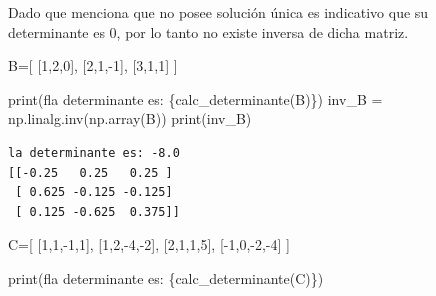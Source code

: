 \documentclass[
  letterpaper,
  DIV=11,
  numbers=noendperiod]{scrartcl}
\newenvironment{Shaded}{\begin{snugshade}}{\end{snugshade}}
\newcommand{\BuiltInTok}[1]{\textcolor[rgb]{0.00,0.23,0.31}{#1}}
\newcommand{\DecValTok}[1]{\textcolor[rgb]{0.68,0.00,0.00}{#1}}
\newcommand{\NormalTok}[1]{\textcolor[rgb]{0.00,0.23,0.31}{#1}}
\newcommand{\OperatorTok}[1]{\textcolor[rgb]{0.37,0.37,0.37}{#1}}
\newcommand{\SpecialCharTok}[1]{\textcolor[rgb]{0.37,0.37,0.37}{#1}}
\newcommand{\SpecialStringTok}[1]{\textcolor[rgb]{0.13,0.47,0.30}{#1}}
\begin{document}
Dado que menciona que no posee solución única es indicativo que su
determinante es 0, por lo tanto no existe inversa de dicha matriz.

\begin{Shaded}
\begin{Highlighting}[]
\NormalTok{B}\OperatorTok{=}\NormalTok{[}
\NormalTok{    [}\DecValTok{1}\NormalTok{,}\DecValTok{2}\NormalTok{,}\DecValTok{0}\NormalTok{],}
\NormalTok{    [}\DecValTok{2}\NormalTok{,}\DecValTok{1}\NormalTok{,}\OperatorTok{{-}}\DecValTok{1}\NormalTok{],}
\NormalTok{    [}\DecValTok{3}\NormalTok{,}\DecValTok{1}\NormalTok{,}\DecValTok{1}\NormalTok{]}
\NormalTok{]}

\BuiltInTok{print}\NormalTok{(}\SpecialStringTok{f\textquotesingle{}la determinante es: }\SpecialCharTok{\{}\NormalTok{calc\_determinante(B)}\SpecialCharTok{\}}\SpecialStringTok{\textquotesingle{}}\NormalTok{)}
\NormalTok{inv\_B }\OperatorTok{=}\NormalTok{ np.linalg.inv(np.array(B))}
\BuiltInTok{print}\NormalTok{(inv\_B)}
\end{Highlighting}
\end{Shaded}

\begin{verbatim}
la determinante es: -8.0
[[-0.25   0.25   0.25 ]
 [ 0.625 -0.125 -0.125]
 [ 0.125 -0.625  0.375]]
\end{verbatim}

\begin{Shaded}
\begin{Highlighting}[]
\NormalTok{C}\OperatorTok{=}\NormalTok{[}
\NormalTok{    [}\DecValTok{1}\NormalTok{,}\DecValTok{1}\NormalTok{,}\OperatorTok{{-}}\DecValTok{1}\NormalTok{,}\DecValTok{1}\NormalTok{],}
\NormalTok{    [}\DecValTok{1}\NormalTok{,}\DecValTok{2}\NormalTok{,}\OperatorTok{{-}}\DecValTok{4}\NormalTok{,}\OperatorTok{{-}}\DecValTok{2}\NormalTok{],}
\NormalTok{    [}\DecValTok{2}\NormalTok{,}\DecValTok{1}\NormalTok{,}\DecValTok{1}\NormalTok{,}\DecValTok{5}\NormalTok{],}
\NormalTok{    [}\OperatorTok{{-}}\DecValTok{1}\NormalTok{,}\DecValTok{0}\NormalTok{,}\OperatorTok{{-}}\DecValTok{2}\NormalTok{,}\OperatorTok{{-}}\DecValTok{4}\NormalTok{]}
\NormalTok{]}

\BuiltInTok{print}\NormalTok{(}\SpecialStringTok{f\textquotesingle{}la determinante es: }\SpecialCharTok{\{}\NormalTok{calc\_determinante(C)}\SpecialCharTok{\}}\SpecialStringTok{\textquotesingle{}}\NormalTok{)}
\end{Highlighting}
\end{Shaded}
\end{document}
